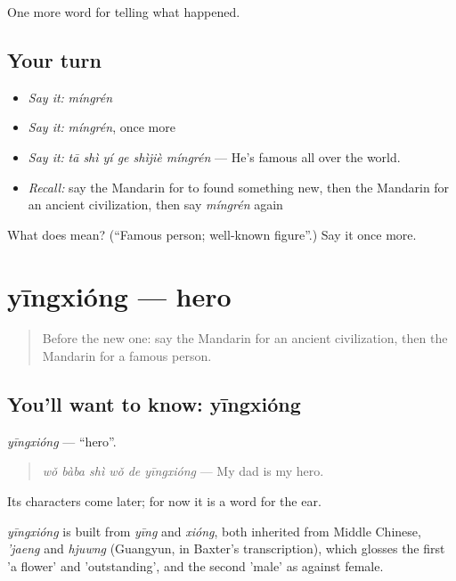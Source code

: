 \begin{grammarlens}[title={What you've built}]
One more word for telling what happened.
\end{grammarlens}

\subsection*{Your turn}
\begin{itemize}
\raggedright
  \item \emph{Say it:} \emph{míngrén}
  \item \emph{Say it:} \emph{míngrén}, once more
  \item \emph{Say it:} \emph{tā shì yí ge shìjiè míngrén} — He's famous all over the world.
  \item \emph{Recall:} say the Mandarin for to found something new, then the Mandarin for an ancient civilization, then say \emph{míngrén} again
\end{itemize}

\begin{tcolorbox}[breakable,colback=teal!4,colframe=teal!35!black,title={Before you move on}]
What does  mean? (\textquotedblleft{}Famous person; well-known figure\textquotedblright{}.) Say it once more.
\end{tcolorbox}
\section[yīngxióng]{yīngxióng — hero}

\label{lesson:ZH-C327-yingxiong}



\begin{quote}
Before the new one: say the Mandarin for an ancient civilization, then the Mandarin for a famous person.
\end{quote}

\subsection*{You'll want to know: yīngxióng}
\emph{yīngxióng} — \textquotedblleft{}hero\textquotedblright{}.

\begin{quote}
\emph{wǒ bàba shì wǒ de yīngxióng} — My dad is my hero.
\end{quote}

Its characters come later; for now it is a word for the ear.

\begin{cousinweb}
\emph{yīngxióng} is built from \emph{yīng} and \emph{xióng}, both inherited from Middle Chinese, \emph{'jaeng} and \emph{hjuwng} (Guangyun, in Baxter's transcription), which glosses the first 'a flower' and 'outstanding', and the second 'male' as against female.
\end{cousinweb}

